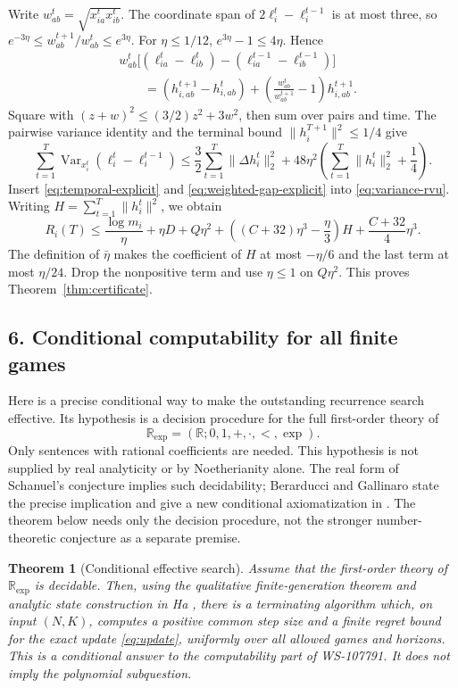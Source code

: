 \documentclass[11pt]{article}
\newtheorem{theorem}{Theorem}
\newcommand{\Var}{\operatorname{Var}}
\newcommand{\norm}[1]{\lVert #1\rVert}
\begin{document}
Write $w_{ab}^t=\sqrt{x_{ia}^tx_{ib}^t}$. The coordinate span of
$2\ell_i^t-\ell_i^{t-1}$ is at most three, so
$e^{-3\eta}\leq w_{ab}^{t+1}/w_{ab}^t\leq e^{3\eta}$.
For $\eta\leq1/12$, $e^{3\eta}-1\leq4\eta$. Hence
\begin{align*}
 &w_{ab}^t\bigl[(\ell_{ia}^t-\ell_{ib}^t)
                   -(\ell_{ia}^{t-1}-\ell_{ib}^{t-1})\bigr]\\
 &\qquad=(h_{i,ab}^{t+1}-h_{i,ab}^t)
       +\left(\frac{w_{ab}^t}{w_{ab}^{t+1}}-1\right)h_{i,ab}^{t+1}.
\end{align*}
Square with $(z+w)^2\leq(3/2)z^2+3w^2$, then sum over pairs and time.
The pairwise variance identity and the terminal bound
$\norm{h_i^{T+1}}^2\leq1/4$ give
\begin{equation}\label{eq:weighted-gap-explicit}
 \sum_{t=1}^T\Var_{x_i^t}(\ell_i^t-\ell_i^{t-1})
 \leq\frac32\sum_{t=1}^T\norm{\Delta h_i^t}_2^2
 +48\eta^2\left(\sum_{t=1}^T\norm{h_i^t}_2^2+\frac14\right).
\end{equation}
Insert \eqref{eq:temporal-explicit} and
\eqref{eq:weighted-gap-explicit} into \eqref{eq:variance-rvu}.
Writing $H=\sum_{t=1}^T\norm{h_i^t}^2$, we obtain
\[
 R_i(T)\leq\frac{\log m_i}{\eta}+\eta D+Q\eta^2
 +\left((C+32)\eta^3-\frac\eta3\right)H
 +\frac{C+32}{4}\eta^3.
\]
The definition of $\bar\eta$ makes the coefficient of $H$ at most
$-\eta/6$ and the last term at most $\eta/24$.
Drop the nonpositive term and use $\eta\leq1$ on $Q\eta^2$.
This proves Theorem~\ref{thm:certificate}.

\subsection*{6. Conditional computability for all finite games}
Here is a precise conditional way to make the outstanding recurrence search
effective. Its hypothesis is a decision procedure for the full first-order
theory of
\[
 \mathbb R_{\exp}=(\mathbb R;0,1,+,\cdot,<,\exp).
\]
Only sentences with rational coefficients are needed. This hypothesis is
not supplied by real analyticity or by Noetherianity alone. The real form
of Schanuel's conjecture implies such decidability; Berarducci and
Gallinaro state the precise implication and give a new conditional
axiomatization in \cite{bg}. The theorem below needs only the decision
procedure, not the stronger number-theoretic conjecture as a separate
premise.

\begin{theorem}[Conditional effective search]\label{thm:conditional-search}
Assume that the first-order theory of $\mathbb R_{\exp}$ is decidable.
Then, using the qualitative finite-generation theorem and analytic state
construction in Ha \cite[Theorem 5.5 and Lemmas 5.6--5.8]{ha}, there is a
terminating algorithm which, on input $(N,K)$, computes a positive common
step size and a finite regret bound for the exact update
\eqref{eq:update}, uniformly over all allowed games and horizons.
This is a conditional answer to the computability part of WS-107791. It
does not imply the polynomial subquestion.
\end{theorem}
\end{document}
